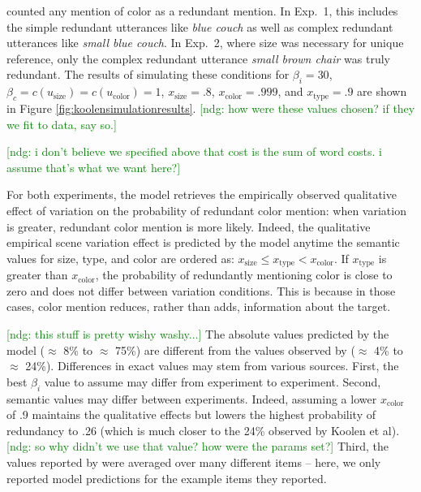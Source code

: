 \documentclass[11pt]{article}
\newcommand{\ndg}[1]{\textcolor{Green}{[ndg: #1]}}
\newcommand{\figref}[1]{Figure \ref{#1}}
\newcommand{\appref}[1]{Appendix \ref{#1}}
\begin{document}
 counted any mention of color as a redundant mention. In Exp.~1, this includes the simple redundant utterances like \emph{blue couch} as well as complex redundant utterances like \emph{small blue couch}. In Exp.~2, where size was necessary for unique reference, only the complex redundant utterance \emph{small brown chair} was truly redundant.  The results of simulating these conditions for $\beta_i = 30$, $ \beta_c = c(u_{\textrm{size}}) = c(u_{\textrm{color}}) = 1$, $x_{\text{size}} = .8$, $x_{\text{color}} = .999$, and $x_{\text{type}} = .9$ are shown in \figref{fig:koolensimulationresults}.%
\ndg{how were these values chosen? if they we fit to data, say so.}


\ndg{i don't believe we specified above that cost is the sum of word costs. i assume that's what we want here?}


For both experiments, the model retrieves the empirically observed qualitative effect of variation on the probability of redundant color mention: when variation is greater, redundant color mention is more likely. 
Indeed, the qualitative empirical scene variation effect is predicted by the model anytime the semantic values for size, type, and color are ordered as: $x_{\text{size}} \leq  x_{\text{type}} < x_{\text{color}}$. If $x_{\text{type}}$ is greater than $x_{\text{color}}$, the probability of redundantly mentioning color is close to zero and does not differ between variation conditions. This is because in those cases, color mention reduces, rather than adds, information about the target. 

\ndg{this stuff is pretty wishy washy...}
The absolute values predicted by the model ($\approx$ 8\% to $\approx$ 75\%) are different from the values observed by   ($\approx$ 4\% to $\approx$ 24\%).
Differences in exact values may stem from various sources. First, the best $\beta_i$ value to assume may differ from experiment to experiment. Second, semantic values may differ between experiments. Indeed, assuming a lower $x_{\text{color}}$  of .9 maintains the qualitative effects but lowers the highest probability of redundancy to .26 (which is much closer to the 24\% observed by Koolen et al). \ndg{so why didn't we use that value? how were the params set?}
Third, the values reported by  were averaged over many different items -- here, we only reported model predictions for the example items they reported.
\end{document}
